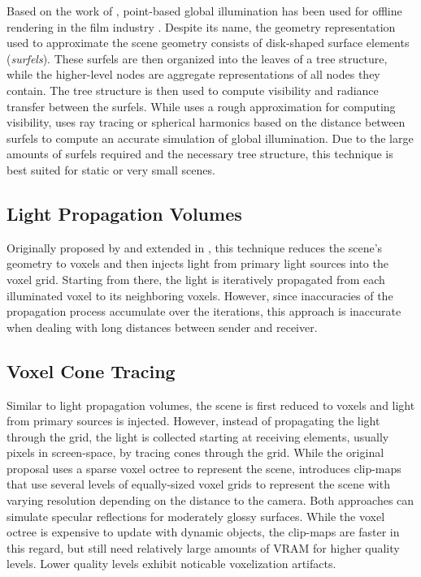 Based on the work of \citet{Bunnell:2005:AO}, point-based global illumination has been used for offline rendering in the film industry \citep{christensen2008point}.
Despite its name, the geometry representation used to approximate the scene geometry consists of disk-shaped surface elements (\emph{surfels}).
These surfels are then organized into the leaves of a tree structure, while the higher-level nodes are aggregate representations of all nodes they contain.
The tree structure is then used to compute visibility and radiance transfer between the surfels.
While \citet{Bunnell:2005:AO} uses a rough approximation for computing visibility, \citet{christensen2008point} uses ray tracing or spherical harmonics based on the distance between surfels to compute an accurate simulation of global illumination.
Due to the large amounts of surfels required and the necessary tree structure, this technique is best suited for static or very small scenes.



\subsection{Light Propagation Volumes}

Originally proposed by \citet{Kaplanyan:2010:LPV} and extended in \citep{Kaplanyan:2010:LPV2}, this technique reduces the scene's geometry to voxels and then injects light from primary light sources into the voxel grid. Starting from there, the light is iteratively propagated from each illuminated voxel to its neighboring voxels. However, since inaccuracies of the propagation process accumulate over the iterations, this approach is inaccurate when dealing with long distances between sender and receiver.


\subsection{Voxel Cone Tracing}

Similar to light propagation volumes, the scene is first reduced to voxels and light from primary sources is injected. However, instead of propagating the light through the grid, the light is collected starting at receiving elements, usually pixels in screen-space, by tracing cones through the grid.
While the original proposal \citep{Crassin:2012:OctreeVCT} uses a sparse voxel octree to represent the scene, \citet{Panteleev:2015:VXGI} introduces clip-maps that use several levels of equally-sized voxel grids to represent the scene with varying resolution depending on the distance to the camera.
Both approaches can simulate specular reflections for moderately glossy surfaces. While the voxel octree is expensive to update with dynamic objects, the clip-maps are faster in this regard, but still need relatively large amounts of VRAM for higher quality levels. Lower quality levels exhibit noticable voxelization artifacts.


